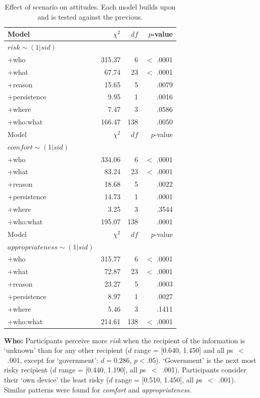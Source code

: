 \begin{table}
\centering
\caption{Effect of scenario on attitudes. Each model builds upon and is tested against the previous.}
\label{tab:anovaEffect}
\begin{tabular}{ l | r | r | r}
\hline
Model &	$\chi^2$ &	$df$ & $p$-value \\ \hline
$risk\sim(1|sid)$ &				 &			 &						\\
+who &				315.37 &	6 &			$<$ .0001 		\\
+what &			67.74 &		23 &		$<$ .0001 		\\
+reason & 			15.65 &		5 &		.0079 			\\
+persistence &		9.95 &		1 &		.0016 			\\
+where	&			7.47 &		3 &		.0586 			\\
+who:what &		166.47 &	138 &	.0050			\\
\hline
Model &	$\chi^2$ &	$df$ & $p$-value \\ \hline
$comfort\sim(1|sid)$ & 			 &			&	 					\\
+who &				334.06 &	6 &			$<$ .0001 		\\
+what &			83.24 &		23 &		$<$ .0001 		\\
+reason &			18.68 &		5 &			.0022 		\\
+persistence &		14.73 &		1 &			.0001 		\\
+where &			3.25 &		3 &			.3544 		\\
+who:what &		195.07 &	138 &		.0001			\\
\hline
Model &	$\chi^2$ &	$df$ & $p$-value \\ \hline
$appropriateness\sim(1|sid)$ &	 &		 &						\\
+who &				315.77 &	6 &			$<$ .0001 		\\
+what &			72.87 &		23 &		$<$ .0001 		\\
+reason &			23.27 &		5 &			.0003 		\\
+persistence &		8.97 &		1 &			.0027 		\\
+where &			5.46 &		3 &			.1411 		\\
+who:what &		214.61 &	138 &		$<$ .0001			\\
\hline
\end{tabular}
\end{table}

\textbf{Who:} Participants perceive more \emph{risk} when the recipient of the information is `unknown' than for any other recipient ($d$ range = [0.640, 1.450] and all $p$s~$<$~.001, except for `government': $d=0.286$, $p < .05$). `Government' is the next most risky recipient ($d$ range = [0.440, 1.190], all $p$s~$<$~.001). Participants consider their `own device' the least risky ($d$ range = [0.510, 1.450], all $p$s~$<$~.001). Similar patterns were found for \emph{comfort} and \emph{appropriateness}.

